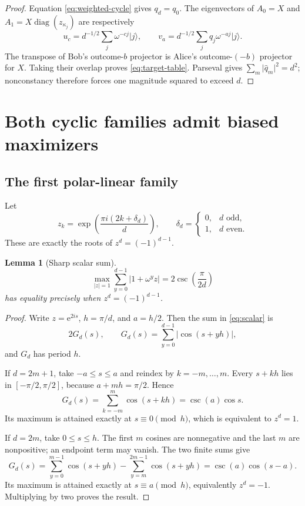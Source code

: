 \documentclass[11pt]{article}
\newtheorem{lemma}[theorem]{Lemma}
\theoremstyle{remark}
\newcommand{\e}{\mathrm e}
\newcommand{\absop}[1]{\lvert #1\rvert}
\begin{document}
\begin{proof}
Equation \eqref{eq:weighted-cycle} gives \(q_d=q_0\).  The eigenvectors of
\(A_0=X\) and
\(A_1=X\operatorname{diag}(z_{\kappa_j})\) are respectively
\[
u_c=d^{-1/2}\sum_j\omega^{-cj}\lvert j\rangle,
\qquad
v_a=d^{-1/2}\sum_jq_j\omega^{-aj}\lvert j\rangle.
\]
The transpose of Bob's outcome-\(b\) projector is Alice's
outcome-\((-b)\) projector for \(X\).  Taking their overlap proves
\eqref{eq:target-table}.  Parseval gives
\(\sum_m\absop{\widehat q_m}^2=d^2\); nonconstancy therefore forces one
magnitude squared to exceed \(d\).
\end{proof}

\section{Both cyclic families admit biased maximizers}

\subsection{The first polar-linear family}

Let
\[
z_k=\exp\!\left(\frac{\pi i(2k+\delta_d)}d\right),
\qquad
\delta_d=
\begin{cases}
0,&d\text{ odd},\\
1,&d\text{ even}.
\end{cases}
\]
These are exactly the roots of \(z^d=(-1)^{d-1}\).

\begin{lemma}[Sharp scalar sum]\label{lem:scalar-sum}
\begin{equation}
\max_{|z|=1}
\sum_{y=0}^{d-1}\absop{1+\omega^yz}
=2\csc\!\left(\frac{\pi}{2d}\right)
\label{eq:scalar}
\end{equation}
has equality precisely when \(z^d=(-1)^{d-1}\).
\end{lemma}

\begin{proof}
Write \(z=\e^{2is}\), \(h=\pi/d\), and \(a=h/2\).  Then the sum in
\eqref{eq:scalar} is
\[
2G_d(s),\qquad
G_d(s)=\sum_{y=0}^{d-1}\absop{\cos(s+yh)},
\]
and \(G_d\) has period \(h\).

If \(d=2m+1\), take \(-a\leq s\leq a\) and reindex by
\(k=-m,\ldots,m\).  Every \(s+kh\) lies in
\([-\pi/2,\pi/2]\), because \(a+mh=\pi/2\).  Hence
\[
G_d(s)=\sum_{k=-m}^m\cos(s+kh)=\csc(a)\cos s.
\]
Its maximum is attained exactly at \(s\equiv0\pmod h\), which is equivalent
to \(z^d=1\).

If \(d=2m\), take \(0\leq s\leq h\).  The first \(m\) cosines are
nonnegative and the last \(m\) are nonpositive; an endpoint term may vanish.
The two finite sums give
\[
G_d(s)
=
\sum_{y=0}^{m-1}\cos(s+yh)
-\sum_{y=m}^{2m-1}\cos(s+yh)
=\csc(a)\cos(s-a).
\]
Its maximum is attained exactly at \(s\equiv a\pmod h\), equivalently
\(z^d=-1\).  Multiplying by two proves the result.
\end{proof}
\end{document}
